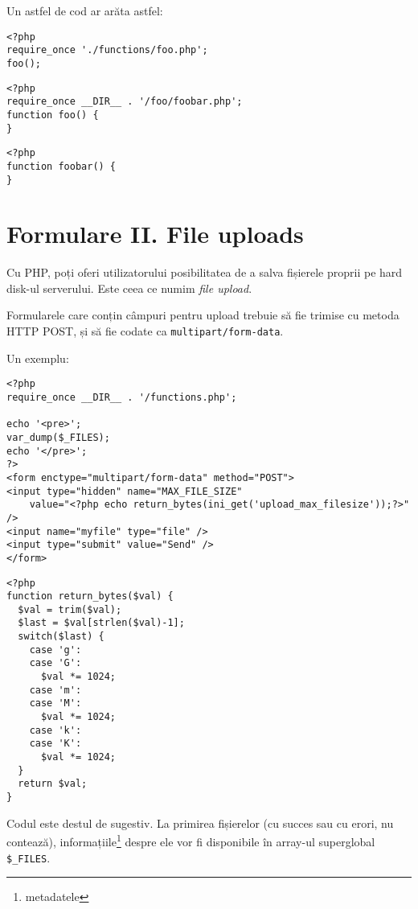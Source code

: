 Un astfel de cod ar arăta astfel:
\begin{lstlisting}[title=index.php]
<?php
require_once './functions/foo.php';
foo();
\end{lstlisting}

\begin{lstlisting}[title=functions/foo.php]
<?php
require_once __DIR__ . '/foo/foobar.php';
function foo() {
}
\end{lstlisting}

\begin{lstlisting}[title=functions/foo/foobar.php]
<?php
function foobar() {
}
\end{lstlisting}


\section{Formulare II. File uploads}
Cu PHP, poți oferi utilizatorului posibilitatea de a salva fișierele
proprii pe hard disk-ul serverului. Este ceea ce numim \textsl{file upload}.

Formularele care conțin câmpuri pentru upload trebuie să fie trimise
cu metoda HTTP POST, și să fie codate ca \texttt{multipart/form-data}.

Un exemplu:
\begin{lstlisting}[title=index.php]
<?php
require_once __DIR__ . '/functions.php';

echo '<pre>';
var_dump($_FILES);
echo '</pre>';
?>
<form enctype="multipart/form-data" method="POST">
<input type="hidden" name="MAX_FILE_SIZE"
	value="<?php echo return_bytes(ini_get('upload_max_filesize'));?>" />
<input name="myfile" type="file" />
<input type="submit" value="Send" />
</form>
\end{lstlisting}

\begin{lstlisting}[title=functions.php]
<?php
function return_bytes($val) {
  $val = trim($val);
  $last = $val[strlen($val)-1];
  switch($last) {
	case 'g':
	case 'G':
	  $val *= 1024;
	case 'm':
	case 'M':
	  $val *= 1024;
	case 'k':
	case 'K':
	  $val *= 1024;
  }
  return $val;
}
\end{lstlisting}
Codul este destul de sugestiv. La primirea fișierelor (cu succes sau cu erori, nu
contează), informațiile\footnote{metadatele} despre ele vor fi disponibile
în array-ul superglobal \texttt{\$\_FILES}.

